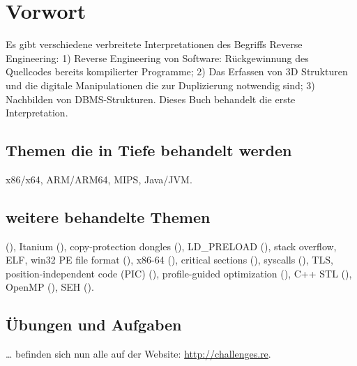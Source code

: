\section*{Vorwort}

Es gibt verschiedene verbreitete Interpretationen des Begriffs Reverse Engineering:
1) Reverse Engineering von Software: Rückgewinnung des Quellcodes bereits kompilierter Programme;
2) Das Erfassen von 3D Strukturen und die digitale Manipulationen die zur Duplizierung notwendig sind;
3) Nachbilden von \ac{DBMS}-Strukturen.
Dieses Buch behandelt die erste Interpretation.

\subsection*{Themen die in Tiefe behandelt werden}

x86/x64, ARM/ARM64, MIPS, Java/JVM.

\subsection*{weitere behandelte Themen}

\oracle (),
Itanium (),
copy-protection dongles (), 
LD\_PRELOAD (),
stack overflow,
\ac{ELF},
win32 PE file format (),
x86-64 (),
critical sections (),
syscalls (), 
\ac{TLS},
position-independent code (\ac{PIC}) (), 
profile-guided optimization (),
C++ STL (),
OpenMP (),
SEH ().

\subsection*{Übungen und Aufgaben}
\dots 
befinden sich nun alle auf der Website: \url{http://challenges.re}.

